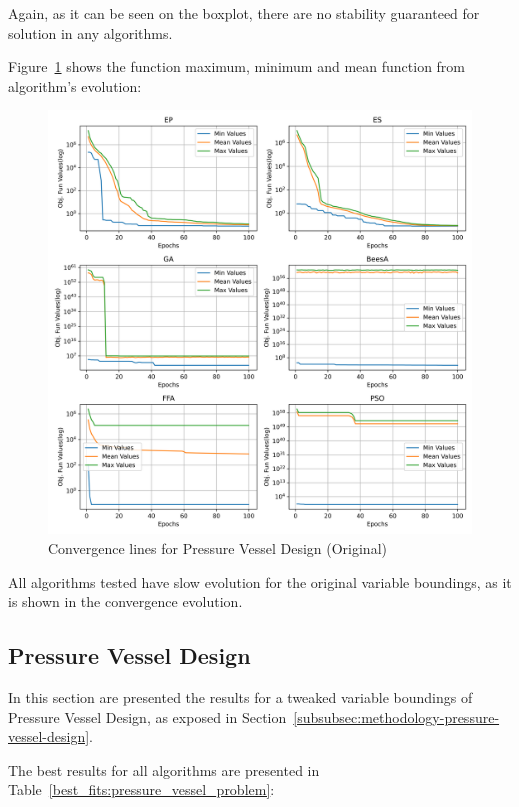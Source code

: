 \documentclass[conference]{IEEEtran}
\begin{document}
Again, as it can be seen on the boxplot, there are no stability guaranteed for solution
in any algorithms.



Figure~\ref{fig:pressure_vessel_problem_original_convergence} shows the
function maximum, minimum and mean function from algorithm's evolution:

\begin{figure}[H]
\centering
\caption{Convergence lines for Pressure Vessel Design (Original)}
\label{fig:pressure_vessel_problem_original_convergence}
\includegraphics[width=0.4 \textwidth]{images/pressure_vessel_problem_original_convergence.png}
\end{figure}

All algorithms tested have slow evolution for the original variable boundings, as it is shown in the convergence evolution.



\subsection{Pressure Vessel Design}
\label{subsec:pressure_vessel_problem}

In this section are presented the results for a tweaked variable boundings of Pressure Vessel Design,
as exposed in Section~\ref{subsubsec:methodology-pressure-vessel-design}.

The best results for all algorithms are presented in Table~\ref{best_fits:pressure_vessel_problem}:
\end{document}
